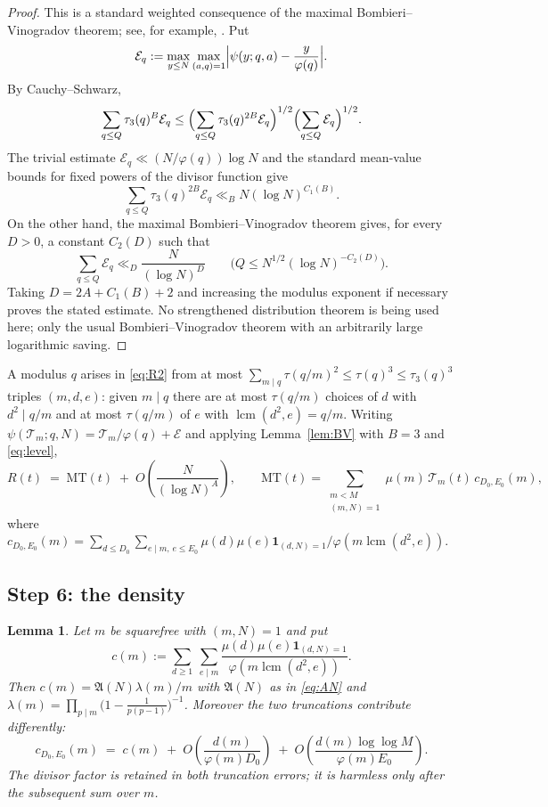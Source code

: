 \documentclass[11pt,a4paper]{article}
\theoremstyle{plain}
\newtheorem{lemma}[theorem]{Lemma}
\theoremstyle{definition}
\theoremstyle{remark}
\newcommand{\AAA}{\mathfrak{A}}
\newcommand{\Tcut}{\mathcal T}
\DeclareMathOperator{\lcm}{lcm}
\begin{document}
\begin{proof}
This is a standard weighted consequence of the maximal
Bombieri--Vinogradov theorem; see, for example,
\cite[\S20.2]{MoV2}.  Put
\[
 \mathcal E_q:=\max_{y\le N}\max_{(a,q)=1}
 \Bigl|\psi(y;q,a)-\frac{y}{\varphi(q)}\Bigr|.
\]
By Cauchy--Schwarz,
\[
 \sum_{q\le Q}\tau_3(q)^B\mathcal E_q
 \le
 \Bigl(\sum_{q\le Q}\tau_3(q)^{2B}\mathcal E_q\Bigr)^{1/2}
 \Bigl(\sum_{q\le Q}\mathcal E_q\Bigr)^{1/2}.
\]
The trivial estimate
$\mathcal E_q\ll (N/\varphi(q))\log N$ and the standard mean-value
bounds for fixed powers of the divisor function give
\[
 \sum_{q\le Q}\tau_3(q)^{2B}\mathcal E_q
 \ll_B N(\log N)^{C_1(B)}.
\]
On the other hand, the maximal Bombieri--Vinogradov theorem gives, for
every $D>0$, a constant $C_2(D)$ such that
\[
 \sum_{q\le Q}\mathcal E_q\ll_D \frac{N}{(\log N)^D}
 \qquad
 \bigl(Q\le N^{1/2}(\log N)^{-C_2(D)}\bigr).
\]
Taking $D=2A+C_1(B)+2$ and increasing the modulus exponent if necessary
proves the stated estimate.  No strengthened distribution theorem is
being used here; only the usual Bombieri--Vinogradov theorem with an
arbitrarily large logarithmic saving.
\end{proof}



A modulus $q$ arises in \eqref{eq:R2} from at most
$\sum_{m\mid q}\tau(q/m)^2\le\tau(q)^3\le\tau_3(q)^3$ triples
$(m,d,e)$: given $m\mid q$ there are at most $\tau(q/m)$ choices of
$d$ with $d^2\mid q/m$ and at most $\tau(q/m)$ of $e$ with
$\lcm(d^2,e)=q/m$. Writing $\psi(\Tcut_m;q,N)=\Tcut_m/\varphi(q)+\mathcal E$
and applying Lemma~\ref{lem:BV} with $B=3$ and \eqref{eq:level},
\begin{equation}\label{eq:R3}
  R(t)\;=\;\mathrm{MT}(t)\;+\;O\!\left(\frac{N}{(\log N)^{A}}\right),
  \qquad
  \mathrm{MT}(t)=\sum_{\substack{m<M\\ (m,N)=1}}
       \mu(m)\,\Tcut_m(t)\,c_{D_0,E_0}(m),
\end{equation}
where
$c_{D_0,E_0}(m)=\sum_{d\le D_0}\sum_{e\mid m,\,e\le E_0}
\mu(d)\mu(e)\mathbf 1_{(d,N)=1}/\varphi(m\lcm(d^2,e))$.

\subsection{Step 6: the density}

\begin{lemma}\label{lem:density}
Let $m$ be squarefree with $(m,N)=1$ and put
\[
  c(m):=\sum_{d\ge1}\ \sum_{e\mid m}
     \frac{\mu(d)\mu(e)\mathbf 1_{(d,N)=1}}{\varphi(m\lcm(d^2,e))}.
\]
Then $c(m)=\AAA(N)\lambda(m)/m$ with $\AAA(N)$ as in \eqref{eq:AN} and
$\lambda(m)=\prod_{p\mid m}\bigl(1-\tfrac{1}{p(p-1)}\bigr)^{-1}$.
Moreover the two truncations contribute differently:
\begin{equation}\label{eq:ctrunc}
  c_{D_0,E_0}(m)\;=\;c(m)
  \;+\;O\!\left(\frac{d(m)}{\varphi(m)D_0}\right)
  \;+\;O\!\left(\frac{d(m)\log\log M}{\varphi(m)E_0}\right).
\end{equation}
The divisor factor is retained in both truncation errors; it is harmless
only after the subsequent sum over $m$.
\end{lemma}
\end{document}
